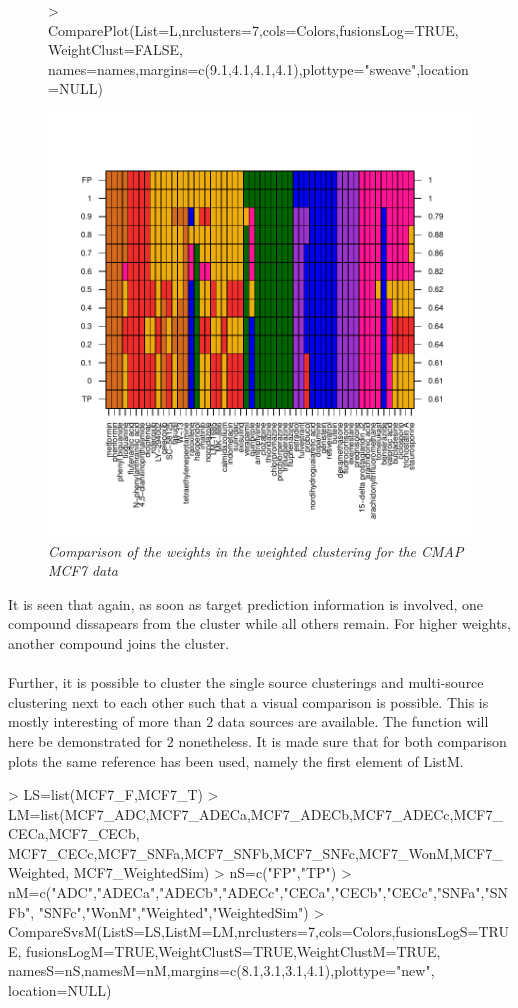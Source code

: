 \documentclass[a4paper]{article}
\begin{document}
\newpage
\begin{figure}[!h] 
\centering
\begin{Schunk}
\begin{Sinput}
> ComparePlot(List=L,nrclusters=7,cols=Colors,fusionsLog=TRUE,WeightClust=FALSE,
             names=names,margins=c(9.1,4.1,4.1,4.1),plottype="sweave",location=NULL)
\end{Sinput}
\end{Schunk}
\includegraphics{IntClustVignette-ComparePlot2}
\caption{{\it Comparison of the weights in the weighted clustering for the CMAP
MCF7 data}\label{MCF7_Weights}}
\end{figure}
\noindent It is seen that again, as soon as target prediction information is
involved, one compound dissapears from the cluster while all others remain. For higher
weights, another compound joins the cluster.\\ \\
Further, it is possible to cluster the single source clusterings and
multi-source clustering next to each other such that a visual comparison is
possible. This is mostly interesting of more than $2$ data sources are
available. The function will here be demonstrated for $2$ nonetheless.
It is made sure that for both comparison plots the same reference has been used,
namely the first element of ListM.
\begin{Schunk}
\begin{Sinput}
> LS=list(MCF7_F,MCF7_T)
> LM=list(MCF7_ADC,MCF7_ADECa,MCF7_ADECb,MCF7_ADECc,MCF7_CECa,MCF7_CECb,
 		MCF7_CECc,MCF7_SNFa,MCF7_SNFb,MCF7_SNFc,MCF7_WonM,MCF7_Weighted,
 		MCF7_WeightedSim)
> nS=c("FP","TP")
> nM=c("ADC","ADECa","ADECb","ADECc","CECa","CECb","CECc","SNFa","SNFb",
       "SNFc","WonM","Weighted","WeightedSim")
> CompareSvsM(ListS=LS,ListM=LM,nrclusters=7,cols=Colors,fusionsLogS=TRUE,
             fusionsLogM=TRUE,WeightClustS=TRUE,WeightClustM=TRUE,
             namesS=nS,namesM=nM,margins=c(8.1,3.1,3.1,4.1),plottype="new",
             location=NULL)
\end{Sinput}
\end{Schunk}
\end{document}

